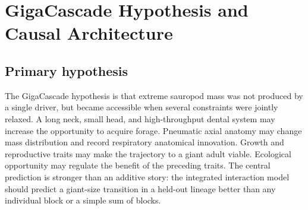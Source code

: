 \documentclass[conference]{IEEEtran}
\newcommand{\gc}{GigaCascade}
\begin{document}
\section{\gc{} Hypothesis and Causal Architecture}

\subsection{Primary hypothesis}

The \gc{} hypothesis is that extreme sauropod mass was not produced by a single driver, but became accessible when several constraints were jointly relaxed. A long neck, small head, and high-throughput dental system may increase the opportunity to acquire forage. Pneumatic axial anatomy may change mass distribution and record respiratory anatomical innovation. Growth and reproductive traits may make the trajectory to a giant adult viable. Ecological opportunity may regulate the benefit of the preceding traits. The central prediction is stronger than an additive story: the integrated interaction model should predict a giant-size transition in a held-out lineage better than any individual block or a simple sum of blocks.
\end{document}
